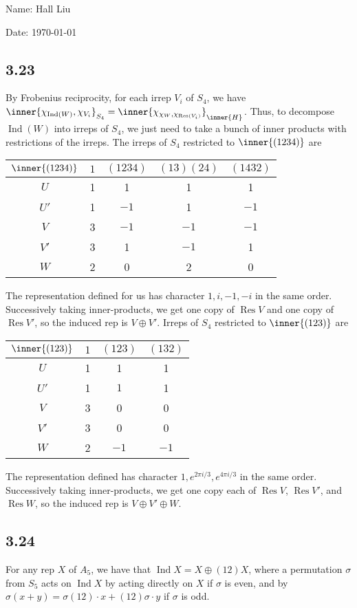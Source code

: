\documentclass{article}
\DeclareMathOperator{\Res}{Res}
\DeclareMathOperator{\Ind}{Ind}
\begin{document}
Name: Hall Liu

Date: \today 
\vspace{1.5cm}
\subsection*{3.23}
By Frobenius reciprocity, for each irrep $V_i$ of $S_4$, we have $\inner{\chi_{\mathrm{Ind}(W)},\chi_{V_i}}_{S_4}=\inner{\chi_{\chi_W,\chi_{\mathrm{Res}(V_i)}}}_\inner{H}$. Thus, to decompose $\Ind(W)$ into irreps of $S_4$, we just need to take a bunch of inner products with restrictions of the irreps.
The irreps of $S_4$ restricted to $\inner{(1234)}$ are

\begin{tabular}{c|cccc}
    $\inner{(1234)}$&$1$&$(1234)$&$(13)(24)$&$(1432)$\\
    \hline
    $U$&1&1&1&1\\
    $U'$&1&$-1$&1&$-1$\\
    $V$&3&$-1$&$-1$&$-1$\\
    $V'$&3&1&$-1$&1\\
    $W$&2&0&2&0\\
\end{tabular}

The representation defined for us has character $1,i,-1,-i$ in the same order. Successively taking inner-products, we get one copy of $\Res V$ and one copy of $\Res V'$, so the induced rep is $V\oplus V'$.
Irreps of $S_4$ restricted to $\inner{(123)}$ are

\begin{tabular}{c|ccc}
    $\inner{(123)}$&$1$&$(123)$&$(132)$\\
    \hline
    $U$&1&1&1\\
    $U'$&1&$1$&1\\
    $V$&3&0&0\\
    $V'$&3&0&0\\
    $W$&2&$-1$&$-1$\\
\end{tabular}

The representation defined has character $1,e^{2\pi i/3},e^{4\pi i/3}$ in the same order. Successively taking inner-products, we get one copy each of $\Res V$, $\Res V'$, and $\Res W$, so the induced rep is $V\oplus V'\oplus W$.
\subsection*{3.24}
For any rep $X$ of $A_5$, we have that $\Ind X=X\oplus (12)X$, where a permutation $\sigma$ from $S_5$ acts on $\Ind X$ by acting directly on $X$ if $\sigma$ is even, and by $\sigma(x+y)=\sigma(12)\cdot x+(12)\sigma\cdot y$ if $\sigma$ is odd.
\end{document}
